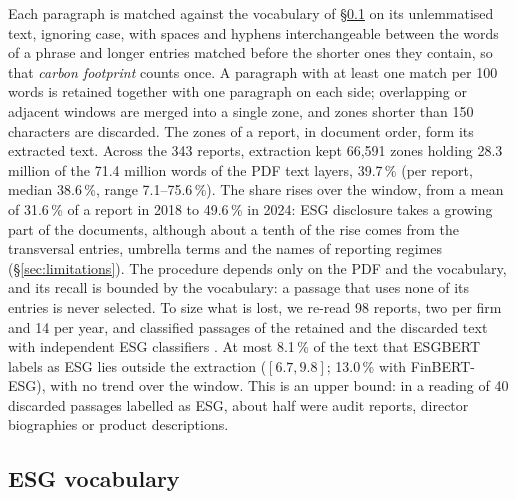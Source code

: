Each paragraph is matched against the vocabulary of \S\ref{sec:method-vocab}
on its unlemmatised text, ignoring case, with spaces and hyphens
interchangeable between the words of a phrase and longer entries matched before
the shorter ones they contain, so that \emph{carbon footprint} counts once. A
paragraph with at least one match per 100 words is retained together with one
paragraph on each side; overlapping or adjacent windows are merged into a
single zone, and zones shorter than 150 characters are discarded. The zones of
a report, in document order, form its extracted text. Across the 343 reports,
extraction kept 66,591 zones holding 28.3 million of the 71.4 million words of
the PDF text layers, 39.7\,\% (per report, median 38.6\,\%, range
7.1--75.6\,\%). The share rises over the window, from a mean of 31.6\,\% of a
report in 2018 to 49.6\,\% in 2024: ESG disclosure takes a growing part of the
documents, although about a tenth of the rise comes from the transversal entries,
umbrella terms and the names of reporting regimes (\S\ref{sec:limitations}). The procedure depends only on the PDF and the vocabulary, and its
recall is bounded by the vocabulary: a passage that uses none of its entries
is never selected. To size what is lost, we re-read 98 reports, two per firm
and 14 per year, and classified passages of the retained and the discarded
text with independent ESG classifiers \citep{schimanski2024esgbert}. At most
8.1\,\% of the text that ESGBERT labels as ESG lies outside the extraction
($[6.7, 9.8]$; 13.0\,\% with FinBERT-ESG), with no trend over the window. This
is an upper bound: in a reading of 40 discarded passages labelled as ESG,
about half were audit reports, director biographies or product descriptions.

\subsection{ESG vocabulary}
\label{sec:method-vocab}

